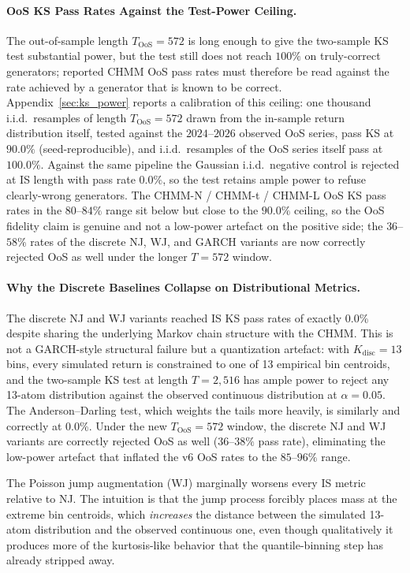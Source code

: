 \paragraph{OoS KS Pass Rates Against the Test-Power Ceiling.}
The out-of-sample length $T_{\text{OoS}} = 572$ is long enough to give the two-sample KS test substantial power, but the test still does not reach $100\%$ on truly-correct generators; reported CHMM OoS pass rates must therefore be read against the rate achieved by a generator that is known to be correct.
Appendix~\ref{sec:ks_power} reports a calibration of this ceiling: one thousand i.i.d.\ resamples of length $T_{\text{OoS}} = 572$ drawn from the in-sample return distribution itself, tested against the $2024$--$2026$ observed OoS series, pass KS at $90.0\%$ (seed-reproducible), and i.i.d.\ resamples of the OoS series itself pass at $100.0\%$.
Against the same pipeline the Gaussian i.i.d.\ negative control is rejected at IS length with pass rate $0.0\%$, so the test retains ample power to refuse clearly-wrong generators.
The CHMM-N / CHMM-t / CHMM-L OoS KS pass rates in the $80$--$84\%$ range sit below but close to the $90.0\%$ ceiling, so the OoS fidelity claim is genuine and not a low-power artefact on the positive side; the $36$--$58\%$ rates of the discrete NJ, WJ, and GARCH variants are now correctly rejected OoS as well under the longer $T = 572$ window.

\paragraph{Why the Discrete Baselines Collapse on Distributional Metrics.}
The discrete NJ and WJ variants reached IS KS pass rates of exactly 0.0\% despite sharing the underlying Markov chain structure with the CHMM.
This is not a GARCH-style structural failure but a quantization artefact: with $K_{\text{disc}} = 13$ bins, every simulated return is constrained to one of 13 empirical bin centroids, and the two-sample KS test at length $T = 2{,}516$ has ample power to reject any 13-atom distribution against the observed continuous distribution at $\alpha = 0.05$.
The Anderson--Darling test, which weights the tails more heavily, is similarly and correctly at 0.0\%.
Under the new $T_{\text{OoS}} = 572$ window, the discrete NJ and WJ variants are correctly rejected OoS as well ($36$--$38\%$ pass rate), eliminating the low-power artefact that inflated the v6 OoS rates to the $85$--$96\%$ range.

The Poisson jump augmentation (WJ) marginally worsens every IS metric relative to NJ.
The intuition is that the jump process forcibly places mass at the extreme bin centroids, which \emph{increases} the distance between the simulated 13-atom distribution and the observed continuous one, even though qualitatively it produces more of the kurtosis-like behavior that the quantile-binning step has already stripped away.

